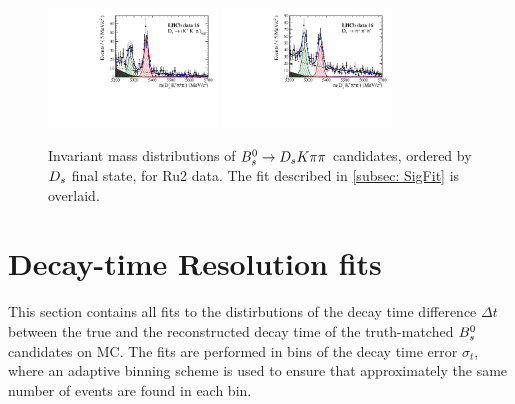 \begin{figure}[h]
\includegraphics[height=!,width=0.4\textwidth]{figs/MassFit/signal_y16_KKpi_NR.pdf}
\includegraphics[height=!,width=0.4\textwidth]{figs/MassFit/signal_y16_pipipi.pdf}
\caption{Invariant mass distributions of ${{B}^0_{s}}\rightarrow{\ensuremath{{D}_{s}}}{\ensuremath{K}}{\ensuremath{\pi}}{\ensuremath{\pi}}$ candidates, ordered by ${{D}_{s}}$ final state, for Ru2 data.
The fit described in \ref{subsec: SigFit} is overlaid.}
\label{fig:massfits_signal_Run2}
\end{figure}


\clearpage
\section{Decay-time Resolution fits}
\label{sec:DecResFits}

This section contains all fits to the distirbutions of the decay time difference $\Delta t$ between the true and the reconstructed decay time of the truth-matched ${{B}^0_{s}}$ candidates on MC.
The fits are performed in bins of the decay time error $\sigma_{t}$, where an adaptive binning scheme is used to ensure that approximately the same number of events are found in each bin. 

